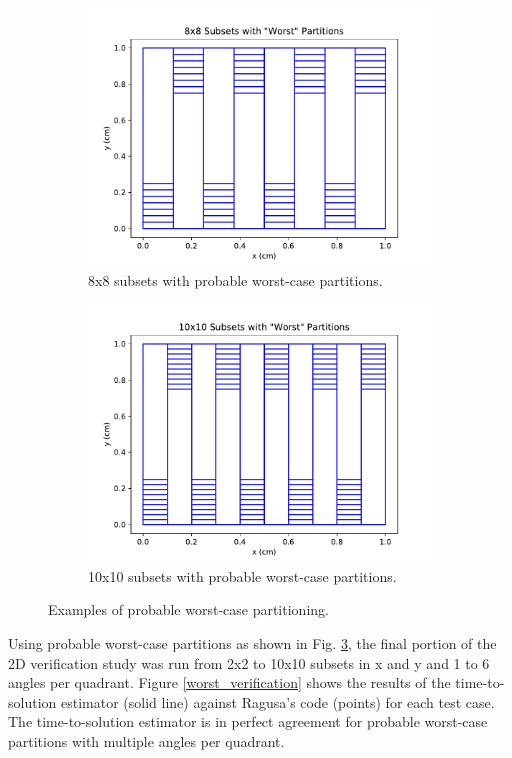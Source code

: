 \begin{figure}[H]
\begin{subfigure}[b]{0.45\textwidth}
  \includegraphics[width=\textwidth]{../cut_line_files/8_worst.pdf}
  \caption{8x8 subsets with probable worst-case partitions.}
  \label{8random}
\end{subfigure}
\begin{subfigure}[b]{0.45\textwidth}
  \includegraphics[width=\textwidth]{../cut_line_files/10_worst.pdf}
  \caption{10x10 subsets with probable worst-case partitions.}
  \label{10random}
\end{subfigure}
\caption{Examples of probable worst-case partitioning.}
\label{worst_partitions}
\end{figure}
Using probable worst-case partitions as shown in Fig. \ref{worst_partitions}, the final portion of the 2D verification study was run from 2x2 to 10x10 subsets in x and y and 1 to 6 angles per quadrant.  Figure \ref{worst_verification} shows the results of the time-to-solution estimator (solid line) against Ragusa's code (points) for each test case. The time-to-solution estimator is in perfect agreement for probable worst-case partitions with multiple angles per quadrant.
